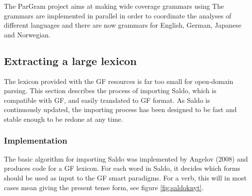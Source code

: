 \documentclass[10pt, a4paper]{article}
\begin{document}
The ParGram \cite{pargram} project aims at making wide coverage grammars using
The grammars are implemented in parallel in order to coordinate the analyses of
different languages and there are now grammars for English, German, Japanese and Norwegian. 



\subsection{Extracting a large lexicon}
The lexicon provided with the GF resources is far too small for open-domain
parsing.
This section describes the process of importing Saldo, which is 
compatible with GF, and easily translated to GF format.
As Saldo is continuously updated, the importing process has been designed to be fast
and stable enough to be redone at any time.

\subsubsection{Implementation}
The basic algorithm for importing Saldo was implemented by Angelov (2008)
and  produces code for a GF lexicon.
For each word in Saldo, it decides which forms should be used as input
to the GF smart paradigms. For a verb, this will in most cases mean giving
the present tense form, see figure \ref{fig:saldoknyt}. \\
\end{document}
